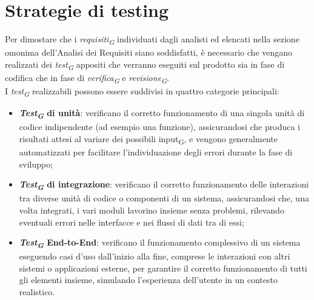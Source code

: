 \section{Strategie di testing}
Per dimostare che i \textit{requisiti\textsubscript{G}} individuati dagli analisti ed elencati nella sezione omonima dell'Analisi dei Requisiti siano soddisfatti, è necessario che vengano realizzati dei \textit{test\textsubscript{G}} appositi che verranno eseguiti sul prodotto sia in fase di codifica che in fase di \textit{verifica\textsubscript{G}} e \textit{revisione\textsubscript{G}}.\\
I \textit{test\textsubscript{G}} realizzabili possono essere suddivisi in quattro categorie principali:
\begin{itemize}
    \item \textbf{\textit{Test\textsubscript{G}} di unità}: verificano il corretto funzionamento di una singola unità di codice indipendente (ad esempio una funzione), assicurandosi che produca i risultati attesi al variare dei possibili input\textsubscript{G}, e vengono generalmente automatizzati per facilitare l'individuazione degli errori durante la fase di sviluppo;
    \item \textbf{\textit{Test\textsubscript{G}} di integrazione}: verificano il corretto funzionamento delle interazioni tra diverse unità di codice o componenti di un sistema, assicurandosi che, una volta integrati, i vari moduli lavorino insieme senza problemi, rilevando eventuali errori nelle interfacce e nei flussi di dati tra di essi;
    \item \textbf{\textit{Test\textsubscript{G}} End-to-End}: verificano il funzionamento complessivo di un sistema eseguendo casi d'uso dall'inizio alla fine, comprese le interazioni con altri sistemi o applicazioni esterne, per garantire il corretto funzionamento di tutti gli elementi insieme, simulando l'esperienza dell'utente in un contesto realistico.
    
\end{itemize}


